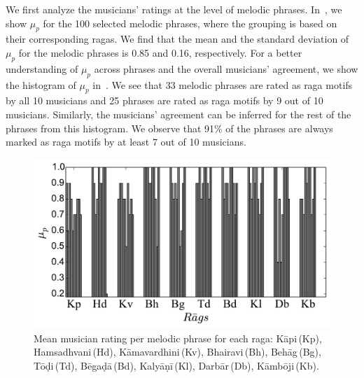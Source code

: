 
We first analyze the musicians' ratings at the level of melodic phrases. In~, we show $\mu_p$ for the 100 selected melodic phrases, where the grouping is based on their corresponding \glspl{raga}. We find that the mean and the standard deviation of $\mu_p$ for the melodic phrases is 0.85 and 0.16, respectively. For a better understanding of $\mu_p$ across phrases and the overall musicians' agreement, we show the histogram of $\mu_p$ in~. We see that 33 melodic phrases are rated as \gls{raga} motifs by all 10 musicians and 25 phrases are rated as \gls{raga} motifs by 9 out of 10 musicians. Similarly, the musicians' agreement can be inferred for the rest of the phrases from this histogram. We observe that 91\% of the phrases are always marked as \gls{raga} motifs by at least 7 out of 10 musicians. 


\begin{figure}
	\begin{center}
		\includegraphics[width=\figSizeEighty]{ch06_patterns/figures/Characterization/per_raaga_per_phrase_rating.pdf}
	\end{center}
	\caption{Mean musician rating per melodic phrase for each \gls{raga}: K\={a}pi\,(Kp), Hamsadhvani\,(Hd), K\={a}mavardhini\,(Kv), Bhairavi\,(Bh), Beh\={a}g\,(Bg), T\={o}\d{d}i\,(Td), B\={e}ga\d{d}\={a}\,(Bd), Kaly\={a}\d{n}\={i}\,(Kl), Darb\={a}r\,(Db), K\={a}mb\={o}ji\,(Kb).}
	\label{fig:average_rating_pattern_characterization}
\end{figure}


